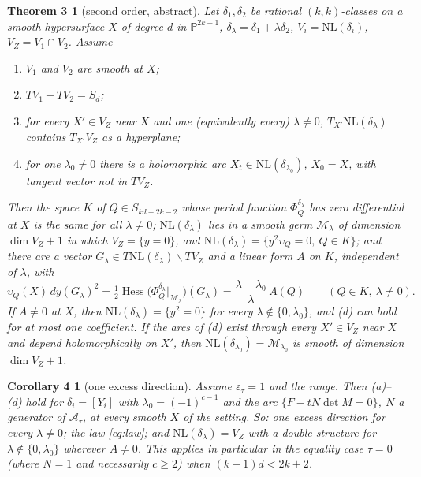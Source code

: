 \documentclass[11pt]{article}
\numberwithin{equation}{section}
\newtheorem*{thm3}{Theorem 3}
\newtheorem*{cor4}{Corollary 4}
\theoremstyle{remark}
\newcommand{\PP}{\mathbb{P}}
\newcommand{\NL}{\mathrm{NL}}
\newcommand{\VZ}{V_Z}
\newcommand{\cM}{\mathcal{M}}
\newcommand{\cA}{\mathcal{A}}
\newcommand{\Hess}{\operatorname{Hess}}
\newcommand{\lz}{\lambda_0}
\newcommand{\et}{\varepsilon_\tau}
\begin{document}
\begin{thm3}[second order, abstract]
Let $\delta_1,\delta_2$ be rational $(k,k)$-classes on a smooth hypersurface $X$ of degree $d$ in $\PP^{2k+1}$,
$\delta_\lambda=\delta_1+\lambda\delta_2$, $V_i=\NL(\delta_i)$, $\VZ=V_1\cap V_2$. Assume
\begin{enumerate}
\item[(a)] $V_1$ and $V_2$ are smooth at $X$;
\item[(b)] $T V_1+TV_2=S_d$;
\item[(c)] for every $X'\in\VZ$ near $X$ and one (equivalently every) $\lambda\ne0$,
$T_{X'}\NL(\delta_\lambda)$ contains $T_{X'}\VZ$ as a hyperplane;
\item[(d)] for one $\lz\ne0$ there is a holomorphic arc $X_t\in\NL(\delta_{\lz})$, $X_0=X$, with tangent
vector not in $T\VZ$.
\end{enumerate}
Then the space $K$ of $Q\in S_{kd-2k-2}$ whose period function $\Phi^{\delta_\lambda}_Q$ has zero differential at
$X$ is the same for all $\lambda\neq0$; $\NL(\delta_\lambda)$ lies in a smooth germ $\cM_\lambda$ of dimension
$\dim\VZ+1$ in which $\VZ=\{y=0\}$, and $\NL(\delta_\lambda)=\{y^2\upsilon_Q=0,\ Q\in K\}$; and there are a vector
$G_\lambda\in T\NL(\delta_\lambda)\smallsetminus T\VZ$ and a linear form $A$ on $K$, independent of $\lambda$,
with
\begin{equation}\label{eq:law}
\upsilon_Q(X)\,dy(G_\lambda)^2=\tfrac12\Hess\bigl(\Phi^{\delta_\lambda}_Q|_{\cM_\lambda}\bigr)(G_\lambda)
=\frac{\lambda-\lz}{\lambda}\,A(Q)\qquad(Q\in K,\ \lambda\ne0).
\end{equation}
If $A\neq0$ at $X$, then $\NL(\delta_\lambda)=\{y^2=0\}$ for every $\lambda\notin\{0,\lz\}$, and (d) can hold
for at most one coefficient. If the arcs of (d) exist through every $X'\in\VZ$ near $X$ and depend
holomorphically on $X'$, then $\NL(\delta_{\lz})=\cM_{\lz}$ is smooth of dimension $\dim\VZ+1$.
\end{thm3}

\begin{cor4}[one excess direction]
Assume $\et=1$ and the range. Then (a)--(d) hold for $\delta_i=[Y_i]$ with $\lz=(-1)^{c-1}$ and the arc
$\{F-tN\det M=0\}$, $N$ a generator of $\cA_\tau$, at every smooth $X$ of the setting. So: one excess direction
for every $\lambda\ne0$; the law \eqref{eq:law}; and $\NL(\delta_\lambda)=\VZ$ with a double structure for
$\lambda\notin\{0,\lz\}$ wherever $A\ne0$. This applies in particular in the \emph{equality case} $\tau=0$ (where
$N=1$ and necessarily $c\ge2$) when $(k-1)d<2k+2$.
\end{cor4}
\end{document}
